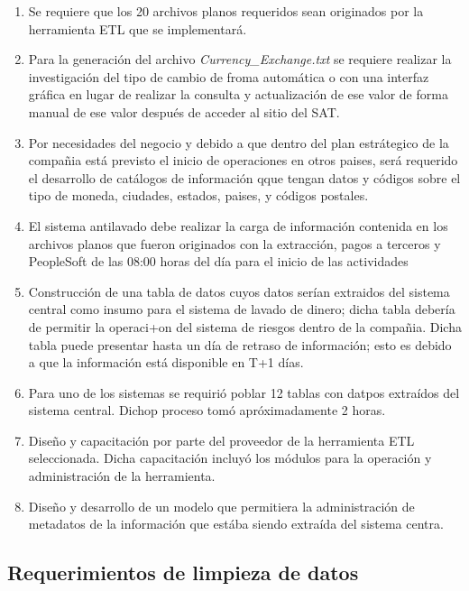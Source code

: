 \begin{enumerate}
\item Se requiere que los 20 archivos planos requeridos sean originados por la
  herramienta ETL que se implementará.

\item Para la generación del archivo \textit{Currency\_Exchange.txt} se requiere
  realizar la investigación del tipo de cambio de froma automática o con una
  interfaz gráfica en lugar de realizar la consulta y actualización de ese valor
  de forma manual de ese valor después de acceder al sitio del SAT.

\item Por necesidades del negocio y debido a que dentro del plan estrátegico de
  la compañia está previsto el inicio de operaciones en otros paises, será
  requerido el desarrollo de catálogos de información qque tengan datos y
  códigos sobre el tipo de moneda, ciudades, estados, paises, y códigos
  postales.

\item El sistema antilavado debe realizar la carga de información contenida en
  los archivos planos que fueron originados con la extracción, pagos a terceros
  y PeopleSoft de las 08:00 horas del día para el inicio de las actividades

\item Construcción de una tabla de datos cuyos datos serían extraidos del
  sistema central como insumo para el sistema de lavado de dinero; dicha tabla
  debería de permitir la operaci+on del sistema de riesgos dentro de la
  compañia. Dicha tabla puede presentar hasta un día de retraso de información;
  esto es debido a que la información está disponible en T+1 días.

\item Para uno de los sistemas se requirió poblar 12 tablas con datpos extraídos
  del sistema central. Dichop proceso tomó apróximadamente 2 horas.

\item Diseño y capacitación por parte del proveedor de la herramienta ETL
  seleccionada. Dicha capacitación incluyó los módulos para la operación y
  administración de la herramienta.

\item Diseño y desarrollo de un modelo que permitiera la administración de
  metadatos de la información que estába siendo extraída del sistema centra.

\end{enumerate}

\subsection{Requerimientos de limpieza de datos}


